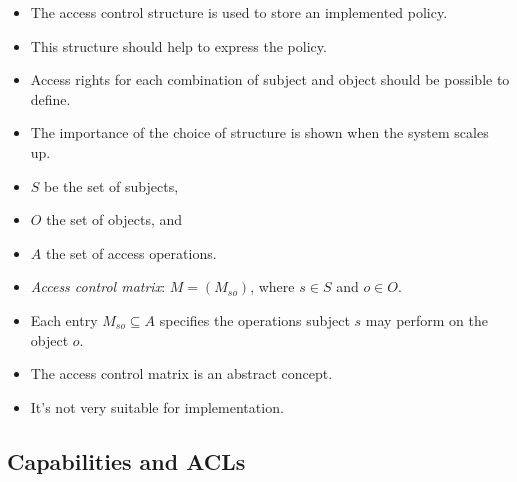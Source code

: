 \documentclass{beamer}
\begin{document}
\begin{frame}
  \begin{itemize}
    \item The access control structure is used to store an implemented policy.

    \item This structure should help to express the policy.

    \item Access rights for each combination of subject and object should be 
      possible to define.

    \item The importance of the choice of structure is shown when the system 
      scales up.

  \end{itemize}
\end{frame}

\begin{frame}
  \begin{definition}
    \begin{itemize}
      \item \(S\) be the set of subjects,
      \item \(O\) the set of objects, and
      \item \(A\) the set of access operations.

        \pause{}

      \item \emph{Access control matrix}: \( M = \left( M_{so} \right)\), where 
        \(s\in S\) and \(o\in O\).
      \item Each entry \(M_{so}\subseteq A\) specifies the operations subject 
        \(s\) may perform on the object \(o\).
    \end{itemize}
  \end{definition}
\end{frame}

\begin{frame}
  \begin{remark}
    \begin{itemize}
      \item The access control matrix is an abstract concept.
      \item It's not very suitable for implementation.
    \end{itemize}
  \end{remark}
\end{frame}

\subsection{Capabilities and ACLs}
\end{document}
